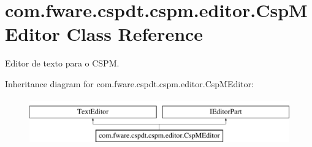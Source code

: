 \hypertarget{classcom_1_1fware_1_1cspdt_1_1cspm_1_1editor_1_1_csp_m_editor}{}\section{com.\+fware.\+cspdt.\+cspm.\+editor.\+Csp\+M\+Editor Class Reference}
\label{classcom_1_1fware_1_1cspdt_1_1cspm_1_1editor_1_1_csp_m_editor}


Editor de texto para o C\+S\+PM.  


Inheritance diagram for com.\+fware.\+cspdt.\+cspm.\+editor.\+Csp\+M\+Editor\+:\begin{figure}[H]
\begin{center}
\leavevmode
\includegraphics[height=2.000000cm]{classcom_1_1fware_1_1cspdt_1_1cspm_1_1editor_1_1_csp_m_editor}
\end{center}
\end{figure}
